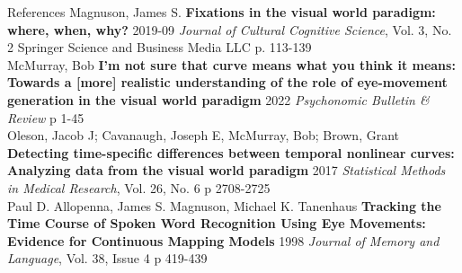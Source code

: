 \documentclass{beamer}
\begin{document}
\begin{frame}{References}\small
Magnuson, James S. \textbf{Fixations in the visual world paradigm: where, when, why?} 2019-09 \textit{Journal of Cultural Cognitive Science}, Vol. 3, No. 2 Springer  Science and Business Media LLC p. 113-139 \newline \\

McMurray, Bob \textbf{I'm not sure that curve means what you think it means: Towards a [more] realistic understanding of the role of eye-movement generation in the visual world paradigm} 2022 \textit{Psychonomic Bulletin \& Review} p 1-45 \newline \\

Oleson, Jacob J; Cavanaugh, Joseph E, McMurray, Bob; Brown, Grant \textbf{Detecting time-specific differences between temporal nonlinear curves: Analyzing data from the visual world paradigm} 2017 \textit{Statistical Methods in Medical Research}, Vol. 26, No. 6 p 2708-2725 \newline \\

Paul D. Allopenna, James S. Magnuson, Michael K. Tanenhaus
\textbf{Tracking the Time Course of Spoken Word Recognition Using Eye Movements: Evidence for Continuous Mapping Models} 1998 \textit{Journal of Memory and Language}, Vol. 38, Issue 4 p 419-439

\end{frame}
\end{document}
